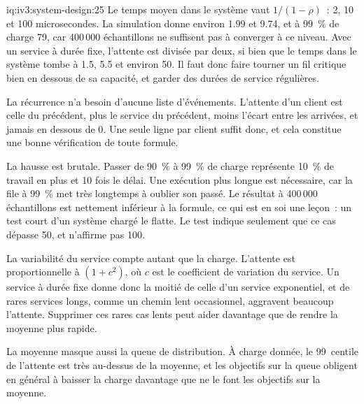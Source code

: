 \begin{solution}{iq:iv3:system-design:25}
Le temps moyen dans le système vaut $1 / (1 - \rho)$~: 2, 10 et 100 microsecondes. La simulation donne environ 1.99 et 9.74, et à 99~\% de charge 79, car 400\,000 échantillons ne suffisent pas à converger à ce niveau. Avec un service à durée fixe, l'attente est divisée par deux, si bien que le temps dans le système tombe à 1.5, 5.5 et environ 50. Il faut donc faire tourner un fil critique bien en dessous de sa capacité, et garder des durées de service régulières.
\label{lst:iv3:sd:queue}

La récurrence n'a besoin d'aucune liste d'événements. L'attente d'un client est celle du précédent, plus le service du précédent, moins l'écart entre les arrivées, et jamais en dessous de 0. Une seule ligne par client suffit donc, et cela constitue une bonne vérification de toute formule.

La hausse est brutale. Passer de 90~\% à 99~\% de charge représente 10~\% de travail en plus et 10 fois le délai. Une exécution plus longue est nécessaire, car la file à 99~\% met très longtemps à oublier son passé. Le résultat à 400\,000 échantillons est nettement inférieur à la formule, ce qui est en soi une leçon~: un test court d'un système chargé le flatte. Le test indique seulement que ce cas dépasse 50, et n'affirme pas 100.

La variabilité du service compte autant que la charge. L'attente est proportionnelle à $(1 + c^2)$, où $c$ est le coefficient de variation du service. Un service à durée fixe donne donc la moitié de celle d'un service exponentiel, et de rares services longs, comme un chemin lent occasionnel, aggravent beaucoup l'attente. Supprimer ces rares cas lents peut aider davantage que de rendre la moyenne plus rapide.

La moyenne masque aussi la queue de distribution. À charge donnée, le 99~centile de l'attente est très au-dessus de la moyenne, et les objectifs sur la queue obligent en général à baisser la charge davantage que ne le font les objectifs sur la moyenne.

\end{solution}

